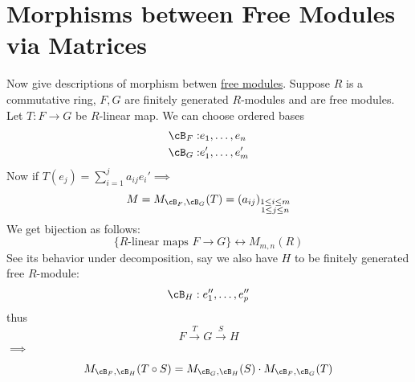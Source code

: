 \section{Morphisms between Free Modules via Matrices}
Now give descriptions of morphism betwen \underline{free modules}. Suppose \( R \) is a commutative
ring, \( F, G \) are finitely generated \( R \)-modules and are free modules. Let \( T: F \to G \)
be \( R \)-linear map. We can choose ordered bases
\[
	\begin{aligned}
		\cB_F: & e_1, \ldots, e_n   \\
		\cB_G: & e_1', \ldots, e_m'
	\end{aligned}
\]
Now if \( T (e_j) = \sum_{i=1}^j a_{ij}e_i'\implies \)
\[
	M = M_{\cB_F, \cB_G} (T) = (a_{ij})_{\substack{1 \le i \le m \\ 1 \le j \le n}}
\]
We get bijection as follows:
\[
	\{R\text{-linear maps } F \to G \} \leftrightarrow M_{m,n}(R)
\]
See its behavior under decomposition, say we also have \( H \) to be finitely generated free \( R
\)-module:
\[
	\cB_H: e_1'', \ldots, e_p''
\]
thus
\[
	F \xrightarrow{T} G \xrightarrow{S} H
\]
\( \implies \)
\begin{equation}
	\label{eq:matrix-morphism}
	M_{\cB_F, \cB_H}(T\circ S) = M_{\cB_G, \cB_H}(S) \cdot M_{\cB_F, \cB_G}(T)
\end{equation}
